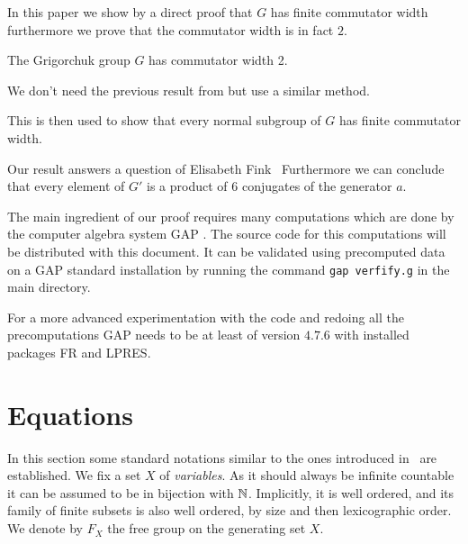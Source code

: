 \documentclass[a4paper,11pt]{amsart}
\begin{document}
In this paper we show by a direct proof that $G$ has finite commutator width 
furthermore we prove that the commutator width is in fact $2$.
\begin{thm}\label{thm:CWGrigorchukGroup}
 The Grigorchuk group $G$ has commutator width 2.
\end{thm}
We don't need the previous result from \cite{Lysenok:QudraticEquationsInGrig}
but use a similar method.

This is then used to show that every normal subgroup of $G$ has
finite commutator width.

Our result answers a question of Elisabeth Fink~\cite[Question 3]{Fink:Conjugacy_growth}
Furthermore we can conclude that every element of $G'$ is a product of 
$6$ conjugates of the generator $a$.

The main ingredient of our proof requires many computations which are 
done by the computer algebra system GAP \cite{GAP4}. The source code
for this computations will be distributed with this document. It can
be validated using precomputed data on a GAP standard installation
by running the command \lstinline{gap verfify.g} in the main directory.

For a more advanced experimentation with the code and redoing all 
the precomputations GAP needs to be at least of version $4.7.6$ 
with installed packages FR\cite{FR2.3.6} and 
LPRES. %

\section{Equations}
In this section some standard notations similar to the ones introduced
in~\cite{ComerfordEquationsFreeGroups} are established. We fix a set
$X$ of \emph{variables}. As it should always be infinite countable it
can be assumed to be in bijection with $\mathbb{N}$. Implicitly, it is well
ordered, and its family of finite subsets is also well ordered, by
size and then lexicographic order. We denote by $F_X$ the free group
on the generating set $X$.
\end{document}
